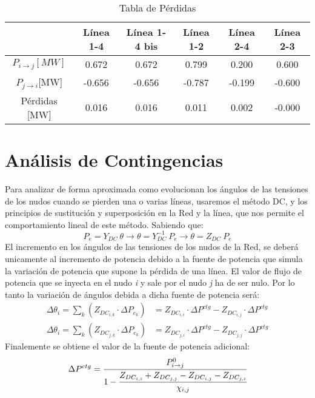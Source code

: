 \documentclass[a4paper,10pt,titlepage,oneside]{article}
\begin{document}
{\begin{table}[htbp]
\end{table}
\begin{table}[htbp]
        \centering
            \begin{tabular}[t]{c c c c c c}
                \rowcolor[gray]{1} &Línea 1-4 & Línea 1-4 bis & Línea 1-2 & Línea 2-4& Línea 2-3  \\ 
                \hline
                \rowcolor[gray]{0.8}$P_{i \rightarrow j}[MW]$ & 0.672 & 0.672 & 0.799 & 0.200 & 0.600 \\
                \hline 
                \rowcolor[gray]{0.6}$P_{j \rightarrow i}$[MW]& -0.656 &-0.656 &-0.787 &-0.199 & -0.600\\ 
                \hline
                \rowcolor[gray]{0.8} Pérdidas [MW] &0.016 &0.016 &0.011 &0.002 &-0.000  \\ 
                \hline
            \end{tabular}
 \caption{Tabla de Pérdidas}
 
\end{table}

\section{Análisis de Contingencias}
Para analizar de forma aproximada como evolucionan los ángulos de las tensiones de los nudos cuando se pierden una o varias líneas, usaremos el método DC, y los principios de sustitución y superposición en la Red y la línea, que nos permite el comportamiento lineal de este método. Sabiendo que:
\begin{equation}
    P_e = Y_{DC}\:\theta \rightarrow \theta = Y_{DC}^{-1}\: P_e\rightarrow \theta = Z_{DC}\: P_e
\end{equation}
El incremento en los ángulos de las tensiones de los nudos de la Red, se deberá unicamente al incremento de potencia debido a la fuente de potencia que simula la variación de potencia que supone la pérdida de una línea. El valor de flujo de potencia que se inyecta en el nudo \textit{i} y sale por el nudo \textit{j} ha de ser nulo. Por lo tanto la variación de ángulos debida a dicha fuente de potencia será:
\begin{align}
    \Delta \theta_i = \sum_{k}(Z_{DC_{i,k}}\cdot \Delta P_{e_{k}}) &=
     Z_{DC_{i,i}}\cdot \Delta P^{ctg}-Z_{DC_{i,j}}\cdot \Delta P^{ctg}\\
    \Delta \theta_i = \sum_{k}(Z_{DC_{j,k}}\cdot \Delta P_{e_{k}}) &=
     Z_{DC_{j,i}}\cdot \Delta P^{ctg}-Z_{DC_{j,j}}\cdot \Delta P^{ctg}
\end{align}
Finalemente se obtiene el valor de la fuente de potencia adicional:
\begin{equation}
    \Delta P^{ctg} = \cfrac{P_{i\rightarrow j}^0}{1-\cfrac{Z_{DC_{i,i}}+Z_{DC_{j,j}}-Z_{DC_{i,j}}-Z_{DC_{j,i}}}{\chi_{i,j}}}
\end{equation}
}
\end{document}
